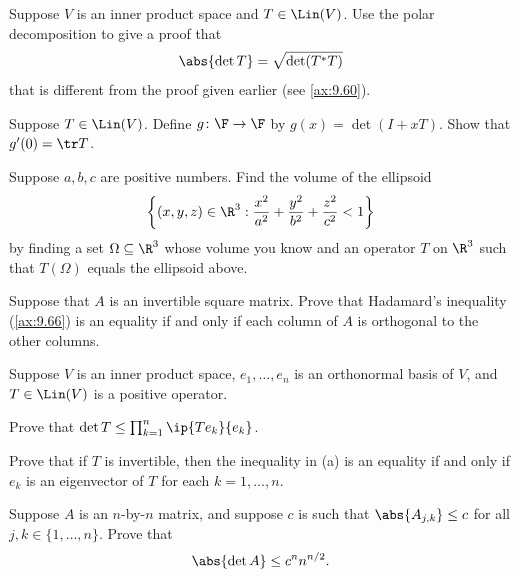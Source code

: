 \begin{exc}
\begin{exercise}
Suppose $V$ is an inner product space and $T\in\Lin(V)$. Use the polar
decomposition to give a proof that
\[ \abs{\det T} = \sqrt{\det(T^*T)} \]
that is different from the proof given earlier (see \ref{ax:9.60}).
\end{exercise}

\begin{exercise}
Suppose $T\in\Lin(V)$. Define $g\colon\F\to\F$ by $g(x)=\det(I+xT)$. Show that
$g'(0)=\tr T$.
\end{exercise}

\begin{exercise}
Suppose $a,b,c$ are positive numbers. Find the volume of the ellipsoid
\[ \biggl\{(x,y,z)\in\R^3 : \frac{x^2}{a^2}+\frac{y^2}{b^2}+\frac{z^2}{c^2}<1
   \biggr\} \]
by finding a set $\Omega\subseteq\R^3$ whose volume you know and an operator
$T$ on $\R^3$ such that $T(\Omega)$ equals the ellipsoid above.
\end{exercise}

\begin{exercise}
Suppose that $A$ is an invertible square matrix. Prove that Hadamard's
inequality (\ref{ax:9.66}) is an equality if and only if each column of $A$ is
orthogonal to the other columns.
\end{exercise}

\begin{exercise}
Suppose $V$ is an inner product space, $e_1,\dots,e_n$ is an orthonormal basis
of $V$, and $T\in\Lin(V)$ is a positive operator.
\begin{parts}
\item Prove that $\det T\le\prod_{k=1}^n\ip{Te_k}{e_k}$.
\item Prove that if $T$ is invertible, then the inequality in (a) is an equality
  if and only if $e_k$ is an eigenvector of $T$ for each $k=1,\dots,n$.
\end{parts}
\end{exercise}

\begin{exercise}
Suppose $A$ is an $n$-by-$n$ matrix, and suppose $c$ is such that
$\abs{A_{j,k}}\le c$ for all $j,k\in\{1,\dots,n\}$. Prove that
\[ \abs{\det A} \le c^nn^{n/2}. \]
\end{exercise}


\end{exc}
